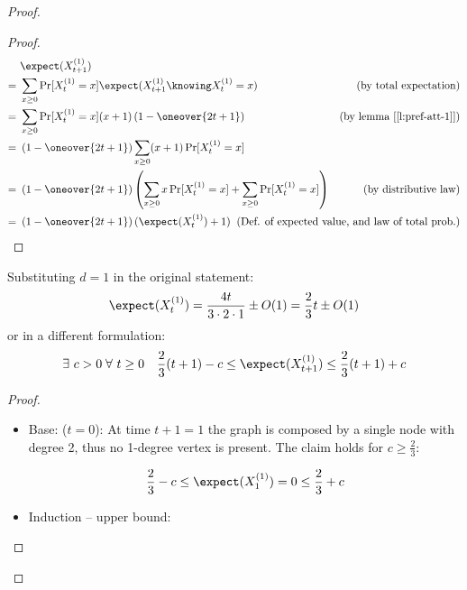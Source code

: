 \begin{proof}
    \begin{proof}
        \begin{align*}
             &\ \expect(X_{t + 1}^{(1)})                                                            & \\
            =&\ \sum_{x \geq 0} \Pr[X_t^{(1)} = x] \expect(X_{t + 1}^{(1)} \knowing X_t^{(1)} = x)  & \text{(by total expectation)}             \\
            =&\ \sum_{x \geq 0} \Pr[X_t^{(1)} = x] (x + 1) \left( 1 - \oneover{2t + 1} \right)      & \text{(by lemma [\ref{l:pref-att-1}])}    \\
            =&\ \left( 1 - \oneover{2t + 1} \right) \sum_{x \geq 0} (x + 1) \Pr[X_t^{(1)} = x]      & \\
            =&\ \left( 1 - \oneover{2t + 1} \right) \left( \sum_{x \geq 0} x \Pr[X_t^{(1)} = x] + \sum_{x \geq 0} \Pr[X_t^{(1)} = x] \right)    & \text{(by distributive law)} \\
            =&\ \left( 1 - \oneover{2t + 1} \right) (\expect(X_t^{(1)}) + 1)                        & \mathllap{\text{(Def. of expected value, and law of total prob.)}} \\
        \end{align*}
    \end{proof}

    \begin{lem}\label{l:pref-att-3} Substituting $d = 1$ in the original statement:
        \[
            \expect(X_t^{(1)}) = \frac{4 t}{3 \cdot 2 \cdot 1} \pm O(1) = \frac{2}{3} t \pm O(1)
        \]
        or in a different formulation:
        \[
            \exists\ c > 0\; \forall\ t\geq 0 \quad \frac{2}{3} (t + 1) - c \leq \expect( X_{t + 1}^{(1)} ) \leq \frac{2}{3} (t + 1) + c
        \]
    \end{lem}

    \begin{proof}

        \begin{itemize}
            \item Base: ($t = 0$): At time $t + 1 = 1$ the graph is composed by a single node with degree 2, thus no 1-degree vertex is present. The claim holds for $c \geq \frac{2}{3}$:

            \[
                \frac{2}{3} - c \leq \expect(X_1^{(1)}) = 0 \leq \frac{2}{3} + c
            \]

            \item Induction -- upper bound:


\end{itemize}
\end{proof}
\end{proof}
